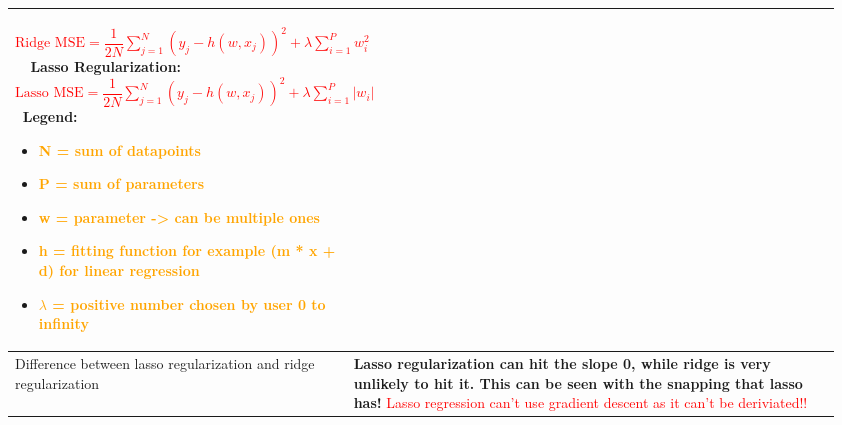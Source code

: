 \documentclass[main.tex,fontsize=8pt,paper=a4,paper=portrait,DIV=calc,]{scrartcl}
\begin{document}
\begin{table}[ht!]
\begin{tabular}{|m{0.2\linewidth}|m{0.755\linewidth}|}
\huge \textcolor{red}{\( \text{Ridge MSE} = \dfrac{1}{2N}\sum^{N}_{j=1}(y_j - h(w,x_j))^2 + \lambda \sum^{P}_{i=1} w_i^2 \)}\newline
\normalsize \, \newline 
\, \newline
\textcolor{OliveGreen}{Lasso Regularization:}\newline
\huge \textcolor{red}{\( \text{Lasso MSE} = \dfrac{1}{2N}\sum^{N}_{j=1}(y_j - h(w,x_j))^2 + \lambda \sum^{P}_{i=1} |w_i| \)}\newline
\normalsize \, \newline  
Legend: \newline
\begin{itemize}
\item \textcolor{Orange}{N = sum of datapoints}
\item \textcolor{Orange}{P = sum of parameters}
\item \textcolor{Orange}{w = parameter -> can be multiple ones}
\item \textcolor{Orange}{h = fitting function for example (m * x + d) for linear regression}
\item \textcolor{Orange}{\( \lambda \) = positive number chosen by user 0 to infinity}
\vspace{-3mm}
\end{itemize}\\
\hline
Difference between lasso regularization and ridge regularization & 
\textbf{Lasso regularization can hit the slope 0, while ridge is very unlikely to hit it. This can be seen with the snapping that lasso has!}\newline
\textcolor{red}{Lasso regression can't use gradient descent as it can't be deriviated!!}\\
\hline
\end{tabular}
\end{table}
\pagebreak
\end{document}
